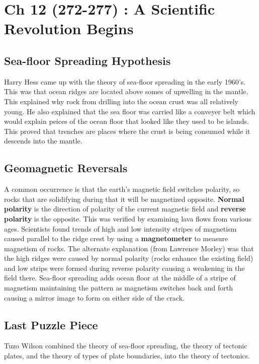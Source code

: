 \documentclass{article}
\begin{document}

\section*{Ch 12 (272-277) : A Scientific Revolution Begins} %
\label{sec:ch_12_272_277_a_scientific_revolution_begins}
\subsection*{Sea-floor Spreading Hypothesis} %
\label{sub:sea_floor_spreading_hypothesis}
Harry Hess came up with the theory of sea-floor spreading in the early 1960's. This was that ocean ridges are located above somes of upwelling in the mantle. This explained why rock from drilling into the ocean crust was all relatively young. He also explained that the sea floor was carried like a conveyer belt which would explain peices of the ocean floor that looked like they used to be islands. This proved that trenches are places where the crust is being consumed while it descends into the mantle.

\subsection*{Geomagnetic Reversals} %
\label{sub:geomagnetic_reversals}
A common occurrence is that the earth's magnetic field switches polarity, so rocks that are solidifying during that it will be magnetized opposite. \textbf{Normal polarity} is the direction of polarity of the current magnetic field and \textbf{reverse polarity} is the opposite. This was verified by examining lava flows from various ages. Scientists found trends of high and low intensity stripes of magnetism caused parallel to the ridge crest by using a \textbf{magnetometer} to measure magnetism of rocks. The alternate explanation (from Lawrence Morley) was that the high ridges were caused by normal polarity (rocks enhance the existing field) and low strips were formed during reverse polarity causing a weakening in the field there. Sea-floor spreading adds ocean floor at the middle of a stripe of magnetism maintaining the pattern as magnetism switches back and forth causing a mirror image to form on either side of the crack.

\subsection*{Last Puzzle Piece} %
\label{sub:last_puzzle_piece}
Tuzo Wilson combined the theory of sea-floor spreading, the theory of tectonic plates, and the theory of types of plate boundaries, into the theory of tectonics.
\end{document}
